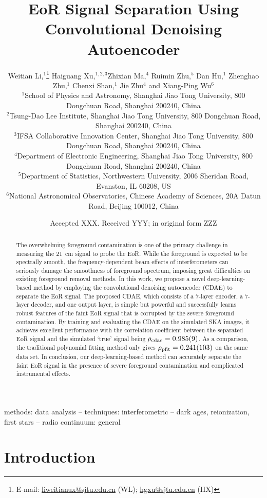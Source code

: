 \documentclass[letters,a4paper,fleqn,usenatbib]{mnras}
\title[EoR Separation with CDAE]{%
  EoR Signal Separation Using Convolutional Denoising Autoencoder
}
\author[Li~et~al.]{%
Weitian Li,$^{1}$\thanks{E-mail:
  \href{mailto:liweitianux@sjtu.edu.cn}{liweitianux@sjtu.edu.cn} (WL);
  \href{mailto:hgxu@sjtu.edu.cn}{hgxu@sjtu.edu.cn} (HX)}
Haiguang Xu,$^{1,2,3}$\footnotemark[1]
Zhixian Ma,$^{4}$
Ruimin Zhu,$^{5}$
Dan Hu,$^{1}$
Zhenghao Zhu,$^{1}$
\newauthor
Chenxi Shan,$^{1}$
Jie Zhu$^{4}$
and
Xiang-Ping Wu$^{6}$
\\
$^{1}${School of Physics and Astronomy,
  Shanghai Jiao Tong University,
  800 Dongchuan Road, Shanghai 200240, China} \\
$^{2}${Tsung-Dao Lee Institute,
  Shanghai Jiao Tong University,
  800 Dongchuan Road, Shanghai 200240, China} \\
$^{3}${IFSA Collaborative Innovation Center,
  Shanghai Jiao Tong University,
  800 Dongchuan Road, Shanghai 200240, China} \\
$^{4}${Department of Electronic Engineering,
  Shanghai Jiao Tong University,
  800 Dongchuan Road, Shanghai 200240, China} \\
$^{5}${Department of Statistics,
  Northwestern University,
  2006 Sheridan Road, Evanston, IL 60208, US} \\
$^{6}${National Astronomical Observatories,
  Chinese Academy of Sciences,
  20A Datun Road, Beijing 100012, China}
}
\date{Accepted XXX. Received YYY; in original form ZZZ}
\newcommand{\R}[1]{\mathrm{#1}}
\begin{document}
\label{firstpage}
\pagerange{\pageref{firstpage}--\pageref{lastpage}}
\maketitle

%
%
\begin{abstract}
The overwhelming foreground contamination is one of the primary
challenge in measuring the \SI{21}{\cm} signal to probe the EoR.
While the foreground is expected to be spectrally smooth,
the frequency-dependent beam effects of interferometers can
seriously damage the smoothness of foreground spectrum,
imposing great difficulties on existing foreground removal methods.
In this work, we propose a novel deep-learning-based method by employing
the convolutional denoising autoencoder (CDAE) to separate the EoR signal.
The proposed CDAE, which consists of a 7-layer encoder, a 7-layer
decoder, and one output layer, is simple but powerful and successfully
learns robust features of the faint EoR signal that is corrupted by the
severe foreground contamination.
By training and evaluating the CDAE on the simulated SKA images, it
achieves excellent performance with the correlation coefficient between
the separated EoR signal and the simulated `true' signal being
$\rho_{\R{cdae}} = \num{0.985 +- 0.009}$.
As a comparison, the traditional polynomial fitting method only gives
$\rho_{\R{pfit}} = \num{0.241 +- 0.103}$ on the same data set.
In conclusion, our deep-learning-based method can accurately separate
the faint EoR signal in the presence of severe foreground contamination
and complicated instrumental effects.
\end{abstract}

\begin{keywords}
methods: data analysis --
techniques: interferometric --
dark ages, reionization, first stars --
radio continuum: general
\end{keywords}



\section{Introduction}
\label{sec:intro}
\end{document}
